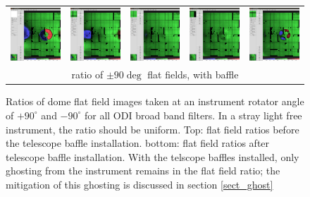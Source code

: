 \documentclass[]{spieman}
\begin{document}
{\begin{landscape}
\begin{figure}
\begin{tabular}{ccccc}
                
                \includegraphics[width=0.17\columnwidth]{images/baffle_u.png} &
                \includegraphics[width=0.17\columnwidth]{images/baffle_g.png} &
                \includegraphics[width=0.17\columnwidth]{images/baffle_r.png} &
                \includegraphics[width=0.17\columnwidth]{images/baffle_i.png} &
                \includegraphics[width=0.17\columnwidth]{images/baffle_z.png} \\[1ex] 
                \multicolumn{5}{c}{ratio of $\pm 90 \deg$ flat
                    fields, with baffle} \\[2ex] 
            \end{tabular}
            
            \caption{\label{fig_flatfieldbaffle} Ratios of dome flat field images
                taken at an instrument rotator angle of $+90^\circ$ and $-90^\circ$ 
                for all ODI broad band filters. In a stray light free  instrument, the ratio should 
                be uniform. Top: flat field ratios before the telescope baffle installation. 
                bottom: flat field ratios after telescope baffle installation. With the telscope 
                baffles installed, only ghosting from the instrument remains in the flat field 
                ratio; the mitigation of this ghosting is discussed in section \ref{sect_ghost} }
            
        \end{figure}
        
    \end{landscape} 
}
\end{document}
